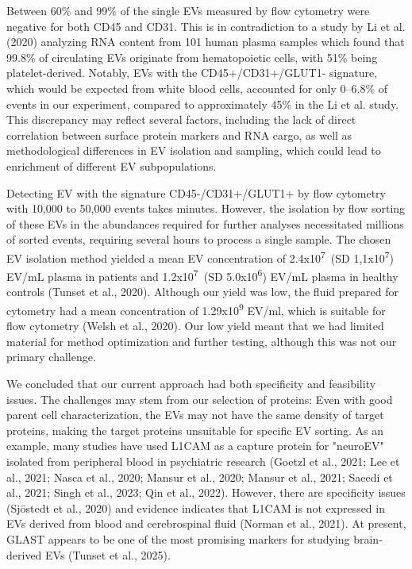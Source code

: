 \documentclass[authordate, empirical, issue]{jote-new-article}
\begin{document}
	Between 60\% and 99\% of the single EVs measured by flow cytometry were negative for both CD45 and CD31. This is in contradiction to a study by Li et al. (2020) analyzing RNA content from 101 human plasma samples which found that 99.8\% of circulating EVs originate from hematopoietic cells, with 51\% being platelet-derived. Notably, EVs with the CD45+/CD31+/GLUT1- signature, which would be expected from white blood cells, accounted for only 0--6.8\% of events in our experiment, compared to approximately 45\% in the Li et al. study. This discrepancy may reflect several factors, including the lack of direct correlation between surface protein markers and RNA cargo, as well as methodological differences in EV isolation and sampling, which could lead to enrichment of different EV subpopulations.







	Detecting EV with the signature CD45-/CD31+/GLUT1+ by flow cytometry with 10,000 to 50,000 events takes minutes. However, the isolation by flow sorting of these EVs in the abundances required for further analyses necessitated millions of sorted events, requiring several hours to process a single sample. The chosen EV isolation method yielded a mean EV concentration of 2.4x10\textsuperscript{7} (SD 1,1x10\textsuperscript{7}) EV/mL plasma in patients and 1.2x10\textsuperscript{7} (SD 5.0x10\textsuperscript{6}) EV/mL plasma in healthy controls (Tunset et al., 2020). Although our yield was low, the fluid prepared for cytometry had a mean concentration of 1.29x10\textsuperscript{9} EV/ml, which is suitable for flow cytometry (Welsh et al., 2020). Our low yield meant that we had limited material for method optimization and further testing, although this was not our primary challenge. 



	We concluded that our current approach had both specificity and feasibility issues. The challenges may stem from our selection of proteins: Even with good parent cell characterization, the EVs may not have the same density of target proteins, making the target proteins unsuitable for specific EV sorting. As an example, many studies have used L1CAM as a capture protein for "neuroEV" isolated from peripheral blood in psychiatric research (Goetzl et al., 2021; Lee et al., 2021; Nasca et al., 2020; Mansur et al., 2020; Mansur et al., 2021; Saeedi et al., 2021; Singh et al., 2023; Qin et al., 2022). However, there are specificity issues (Sjöstedt et al., 2020) and evidence indicates that L1CAM is not expressed in EVs derived from blood and cerebrospinal fluid (Norman et al., 2021). At present, GLAST appears to be one of the most promising markers for studying brain-derived EVs (Tunset et al., 2025).
\end{document}
